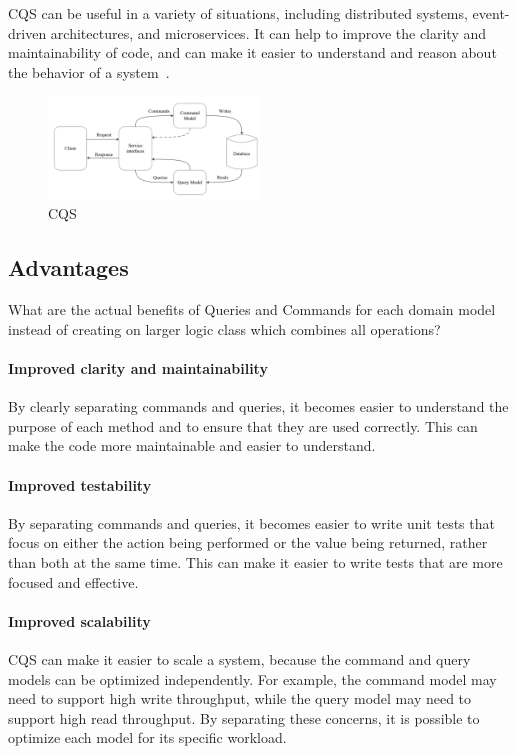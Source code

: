 \documentclass[11pt,conference]{IEEEtran}
\begin{document}
CQS can be useful in a variety of situations, including distributed systems, event-driven architectures, and microservices. It can help to improve the clarity and maintainability of code, and can make it easier to understand and reason about the behavior of a system~\cite{martinfowler-cqs}.

\begin{figure}[h]
    \centering
    \includegraphics[width=0.5\textwidth]{images/CQS.png}
    \caption{CQS~\cite[14]{cqrs-in-practise}}
    \label{fig:cqs}
\end{figure}

\subsection{Advantages}

What are the actual benefits of Queries and Commands for each domain model instead of creating on larger logic class which combines all operations?~\cite{martinfowler-cqs}

\paragraph{Improved clarity and maintainability}
By clearly separating commands and queries, it becomes easier to understand the purpose of each method and to ensure that they are used correctly. This can make the code more maintainable and easier to understand.

\paragraph{Improved testability}
By separating commands and queries, it becomes easier to write unit tests that focus on either the action being performed or the value being returned, rather than both at the same time. This can make it easier to write tests that are more focused and effective.

\paragraph{Improved scalability}
CQS can make it easier to scale a system, because the command and query models can be optimized independently. For example, the command model may need to support high write throughput, while the query model may need to support high read throughput. By separating these concerns, it is possible to optimize each model for its specific workload.
\end{document}
